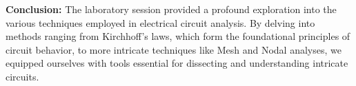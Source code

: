 \documentclass{article}
\begin{document}


\begin{flushleft}
\textbf{Conclusion:}
The laboratory session provided a profound exploration into the various techniques employed in electrical circuit analysis. By delving into methods ranging from Kirchhoff's laws, which form the foundational principles of circuit behavior, to more intricate techniques like Mesh and Nodal analyses, we equipped ourselves with tools essential for dissecting and understanding intricate circuits.
 \end{flushleft}
\end{document}
